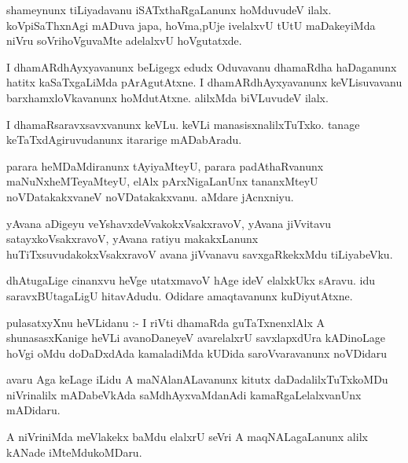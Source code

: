 \documentclass{article}
\begin{document}
\begin{mn}
shameynunx  tiLiyadavanu  iSATxthaRgaLanunx  hoMduvudeV  ilalx.  koVpiSaThxnAgi  mADuva  
japa,  hoVma,pUje  ivelalxvU  tUtU  maDakeyiMda  niVru  soVrihoVguvaMte  adelalxvU  hoVgutatxde.
\end{mn}

\begin{mn}
I  dhamARdhAyxyavanunx  beLigegx  edudx  Oduvavanu  dhamaRdha  haDaganunx  hatitx  
kaSaTxgaLiMda  pArAgutAtxne.  I  dhamARdhAyxyavanunx  keVLisuvavanu    
barxhamxloVkavanunx  hoMdutAtxne.  alilxMda  biVLuvudeV  ilalx.
\end{mn}

\begin{mn}
I dhamaRsaravxsavxvanunx  keVLu.  keVLi  manasisxnalilxTuTxko.  tanage  
keTaTxdAgiruvudanunx  itararige  mADabAradu.
\end{mn}

\begin{mn}
parara  heMDaMdiranunx  tAyiyaMteyU,  parara  padAthaRvanunx  maNuNxheMTeyaMteyU,  
elAlx  pArxNigaLanUnx  tananxMteyU  noVDatakakxvaneV  noVDatakakxvanu.  aMdare  jAcnxniyu.
\end{mn}

\begin{mn}
yAvana  aDigeyu  veYshavxdeVvakokxVsakxravoV,  yAvana  jiVvitavu  satayxkoVsakxravoV,  yAvana  
ratiyu  makakxLanunx  huTiTxsuvudakokxVsakxravoV  avana  jiVvanavu  savxgaRkekxMdu  tiLiyabeVku.
\end{mn}

\begin{mn}
dhAtugaLige  cinanxvu  heVge  utatxmavoV  hAge  ideV  elalxkUkx sAravu.  
idu  saravxBUtagaLigU  hitavAdudu.  Odidare  amaqtavanunx  kuDiyutAtxne.
\end{mn}

\begin{mn}
pulasatxyXnu  heVLidanu :-  I riVti  dhamaRda  guTaTxnenxlAlx A  shunasasxKanige  
heVLi  avanoDaneyeV  avarelalxrU  savxlapxdUra  kADinoLage  hoVgi  oMdu  doDaDxdAda  
kamaladiMda  kUDida  saroVvaravanunx  noVDidaru
\end{mn}

\begin{mn}
avaru  Aga  keLage  iLidu  A  maNAlanALavanunx  kitutx  daDadalilxTuTxkoMDu  
niVrinalilx  mADabeVkAda  saMdhAyxvaMdanAdi  kamaRgaLelalxvanUnx  mADidaru.
\end{mn}

\begin{mn}
A  niVriniMda  meVlakekx  baMdu  elalxrU  seVri  A  maqNALagaLanunx  alilx  kANade  iMteMdukoMDaru.
\end{mn}
\end{document}
